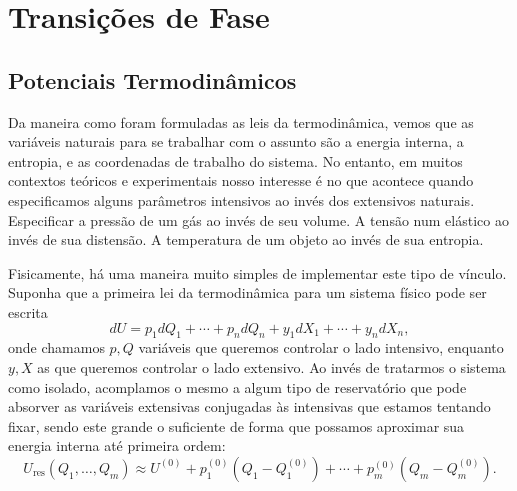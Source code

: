 \section{Transições de Fase}

\subsection{Potenciais Termodinâmicos}

Da maneira como foram formuladas as leis da termodinâmica, vemos que as
variáveis naturais para se trabalhar com o assunto são a energia interna, a
entropia, e as coordenadas de trabalho do sistema. No entanto, em muitos
contextos teóricos e experimentais nosso interesse é no que acontece quando
especificamos alguns parâmetros intensivos ao invés dos extensivos naturais.
Especificar a pressão de um gás ao invés de seu volume. A tensão num elástico ao
invés de sua distensão. A temperatura de um objeto ao invés de sua entropia. 

Fisicamente, há uma maneira muito simples de implementar este tipo de vínculo.
Suponha que a primeira lei da termodinâmica para um sistema físico pode ser
escrita
$$dU=p_1dQ_1+\cdots+p_ndQ_n+y_1dX_1+\cdots+y_ndX_n,$$
onde chamamos $p,Q$ variáveis que queremos controlar o lado intensivo, enquanto
$y,X$ as que queremos controlar o lado extensivo. Ao invés de tratarmos o
sistema como isolado, acomplamos o mesmo a algum tipo de reservatório que pode
absorver as variáveis extensivas conjugadas às intensivas que estamos tentando
fixar, sendo este grande o suficiente de forma que possamos aproximar sua
energia interna até primeira ordem:
$$U_\text{res}(Q_1,\dots,Q_m)
\approx U^{(0)}+p^{(0)}_1(Q_1-Q^{(0)}_1)+\cdots+p^{(0)}_m(Q_m-Q^{(0)}_m).$$

